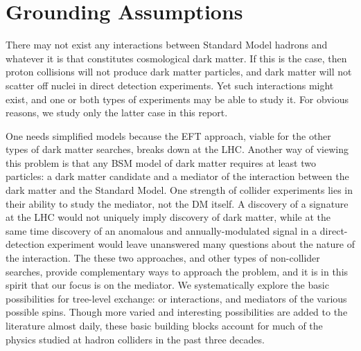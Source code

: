\section{Grounding Assumptions}

There may not exist any interactions between Standard Model hadrons
and whatever it is that constitutes cosmological dark matter. If this
is the case, then proton collisions will not produce dark matter
particles, and dark matter will not scatter off nuclei in direct
detection experiments. Yet such interactions might exist, and one or
both types of experiments may be able to study it. For obvious
reasons, we study only the latter case in this report.

One needs simplified models because the EFT approach, viable for the
other types of dark matter searches, breaks down at the LHC. Another
way of viewing this problem is that any BSM model of dark matter
requires at least two particles: a dark matter candidate and a
mediator of the interaction between the dark matter and the Standard
Model. One strength of collider experiments lies in their ability to
study the mediator, not the DM itself. A discovery of a \MET signature
at the LHC would not uniquely imply discovery of dark matter, while at
the same time discovery of an anomalous and annually-modulated signal
in a direct-detection experiment would leave unanswered many questions
about the nature of the interaction. The these two approaches, and
other types of non-collider searches, provide complementary ways to
approach the problem, and it is in this spirit that our focus is on
the mediator. We systematically explore the basic possibilities for
tree-level exchange: \schannel or \thchannel interactions, and
mediators of the various possible spins. Though more varied and
interesting possibilities are added to the literature almost daily,
these basic building blocks account for much of the physics studied at
hadron colliders in the past three decades.

